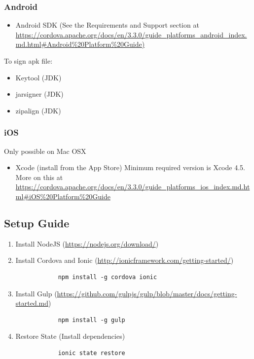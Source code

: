 \begin{appendices}
\subsubsection{Android}
\begin{itemize}
	\item Android SDK (See the Requirements and Support section at \url{https://cordova.apache.org/docs/en/3.3.0/guide_platforms_android_index.md.html#Android%20Platform%20Guide)}
\end{itemize}

To sign apk file:
\begin{itemize}
	\item Keytool (JDK)
	\item jarsigner (JDK)
	\item zipalign (JDK)
\end{itemize}

\subsubsection{iOS}
Only possible on Mac OSX
\begin{itemize}
	\item Xcode (install from the App Store)
	Minimum required version is Xcode 4.5. More on this at \url{https://cordova.apache.org/docs/en/3.3.0/guide_platforms_ios_index.md.html#iOS%20Platform%20Guide}
\end{itemize}

\subsection{Setup Guide}

\begin{enumerate}
	\item Install NodeJS (\url{https://nodejs.org/download/})
	\item Install Cordova and Ionic (\url{http://ionicframework.com/getting-started/}) 
 		\begin{verbatim}
 			npm install -g cordova ionic
 		\end{verbatim}
	\item Install Gulp (\url{https://github.com/gulpjs/gulp/blob/master/docs/getting-started.md})
		\begin{verbatim}
			npm install -g gulp
		\end{verbatim}
	\item Restore State (Install dependencies)
  		\begin{verbatim}
  			ionic state restore
  		\end{verbatim}
\end{enumerate}
  

\end{appendices}
